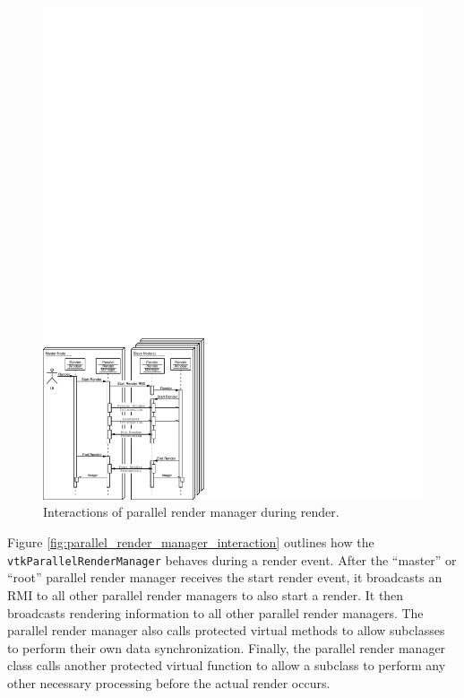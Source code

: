 \documentclass[twocolumn]{article}
\newcommand{\cidentifier}[1]{\texttt{#1}}
\begin{document}
  \begin{figure}
    \begin{center}
      \includegraphics[width=\linewidth]
		      {images/ParallelRenderManagerInteraction}
    \end{center}
    \caption{Interactions of parallel render manager during render.}
    \label{fig:parallel_render_manager_interaction}
  \end{figure}
  Figure \vref{fig:parallel_render_manager_interaction} outlines how the
  \cidentifier{vtk\-Parallel\-Render\-Manager} behaves during a render
  event.  After the ``master'' or ``root'' parallel render manager receives
  the start render event, it broadcasts an RMI to all other parallel render
  managers to also start a render.  It then broadcasts rendering
  information to all other parallel render managers.  The parallel render
  manager also calls protected virtual methods to allow subclasses to
  perform their own data synchronization.  Finally, the parallel render
  manager class calls another protected virtual function to allow a
  subclass to perform any other necessary processing before the actual
  render occurs.
\end{document}
